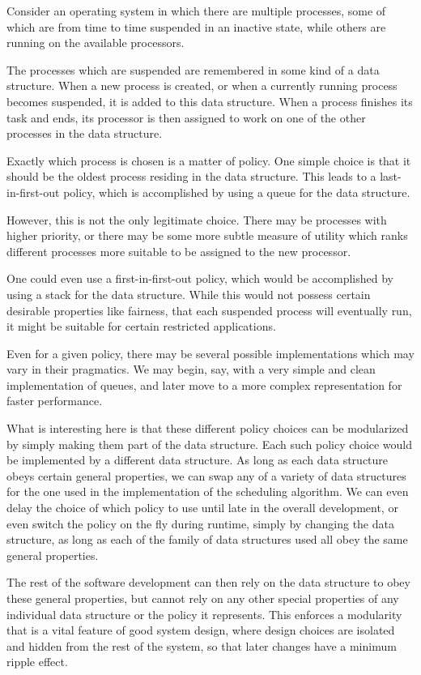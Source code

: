 Consider an operating system in which there are multiple processes,
some of which are from time to time suspended in an inactive state,
while others are running on the available processors.

The processes which are suspended are remembered in some kind of
a data structure. When a new process is created, or when 
a currently running process becomes suspended,
it is added to this data structure. When a process finishes its task
and ends, its processor is then assigned to work on one of the
other processes in the data structure.

Exactly which process is chosen is a matter of policy. One simple
choice is that it should be the oldest process residing in the data
structure. This leads to a last-in-first-out policy, which is 
accomplished by using a queue for the data structure.

However, this is not the only legitimate choice. There may be
processes with higher priority, or there may be some more subtle
measure of utility which ranks different processes more suitable
to be assigned to the new processor.

One could even use a first-in-first-out policy, which would be 
accomplished by using a stack for the data structure. While this 
would not possess certain desirable properties like fairness, 
that each suspended process will eventually run, it might be 
suitable for certain restricted applications.

Even for a given policy, there may be several possible implementations
which may vary in their pragmatics. We may begin, say, with a
very simple and clean implementation of queues, and later move
to a more complex representation for faster performance.

What is interesting here is that these different policy choices can
be modularized by simply making them part of the data structure.
Each such policy choice 
would be implemented by a different data structure.
As long as each data structure obeys certain general properties,
we can swap any of a variety of data structures for the one used in
the implementation of the scheduling algorithm. We can even delay
the choice of which policy to use until late in the overall development,
or even switch the policy on the fly during runtime, simply by changing
the data structure, as long as each of the family of data structures used 
all obey the same general properties.

The rest of the software development can then rely on the data structure
to obey these general properties, but cannot rely on any
other special properties of any individual data structure or the
policy it represents. This enforces a modularity that is a vital
feature of good system design, where design choices are isolated
and hidden from the rest of the system, so that later changes have
a minimum ripple effect.

